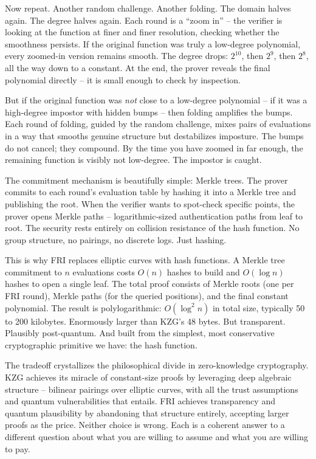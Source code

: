 \documentclass[
  11pt,
  openany]{report}
\begin{document}
Now repeat. Another random challenge. Another folding. The domain halves again.
The degree halves again. Each round is a ``zoom in'' -- the verifier is looking
at the function at finer and finer resolution, checking whether the smoothness
persists. If the original function was truly a low-degree polynomial, every
zoomed-in version remains smooth. The degree drops: \(2^{10}\), then \(2^9\),
then \(2^8\), all the way down to a constant. At the end, the prover reveals the
final polynomial directly -- it is small enough to check by inspection.

But if the original function was \emph{not} close to a low-degree polynomial --
if it was a high-degree impostor with hidden bumps -- then folding amplifies the
bumps. Each round of folding, guided by the random challenge, mixes pairs of
evaluations in a way that smooths genuine structure but destabilizes imposture.
The bumps do not cancel; they compound. By the time you have zoomed in far
enough, the remaining function is visibly not low-degree. The impostor is
caught.

The commitment mechanism is beautifully simple: Merkle trees. The prover commits
to each round's evaluation table by hashing it into a Merkle tree and publishing
the root. When the verifier wants to spot-check specific points, the prover
opens Merkle paths -- logarithmic-sized authentication paths from leaf to root.
The security rests entirely on collision resistance of the hash function. No
group structure, no pairings, no discrete logs. Just hashing.

This is why FRI replaces elliptic curves with hash functions. A Merkle tree
commitment to \(n\) evaluations costs \(O(n)\) hashes to build and \(O(\log n)\)
hashes to open a single leaf. The total proof consists of Merkle roots (one per
FRI round), Merkle paths (for the queried positions), and the final constant
polynomial. The result is polylogarithmic: \(O(\log^2 n)\) in total size,
typically 50 to 200 kilobytes. Enormously larger than KZG's 48 bytes. But
transparent. Plausibly post-quantum. And built from the simplest, most
conservative cryptographic primitive we have: the hash function.

The tradeoff crystallizes the philosophical divide in zero-knowledge
cryptography. KZG achieves its miracle of constant-size proofs by leveraging
deep algebraic structure -- bilinear pairings over elliptic curves, with all the
trust assumptions and quantum vulnerabilities that entails. FRI achieves
transparency and quantum plausibility by abandoning that structure entirely,
accepting larger proofs as the price. Neither choice is wrong. Each is a
coherent answer to a different question about what you are willing to assume and
what you are willing to pay.
\end{document}
